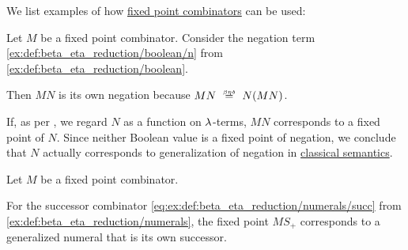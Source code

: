 \begin{example}\label{ex:def:function_fixed_point_combinator}
  We list examples of how \hyperref[def:function_fixed_point_combinator]{fixed point combinators} can be used:
  \begin{thmenum}
     Let \( M \) be a fixed point combinator. Consider the negation term \ref{ex:def:beta_eta_reduction/boolean/n} from \cref{ex:def:beta_eta_reduction/boolean}.

    Then \( MN \) is its own negation because \( MN \equivrel{\beta\eta\delta} N(MN) \).

    If, as per , we regard \( N \) as a function on \( {\mathrm \lambda} \)-terms, \( MN \) corresponds to a fixed point of \( N \). Since neither Boolean value is a fixed point of negation, we conclude that \( N \) actually corresponds to generalization of negation in \hyperref[def:propositional_semantics/classical]{classical semantics}.

     Let \( M \) be a fixed point combinator.

    For the successor combinator \ref{eq:ex:def:beta_eta_reduction/numerals/succ} from \cref{ex:def:beta_eta_reduction/numerals}, the fixed point \( MS_+ \) corresponds to a generalized numeral that is its own successor.
  \end{thmenum}
\end{example}

